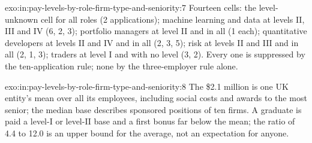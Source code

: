 \begin{solution}{exo:in:pay-levels-by-role-firm-type-and-seniority:7}
Fourteen cells: the level-unknown cell for all roles (2 applications); machine learning and data at levels II, III and IV
(6, 2, 3); portfolio managers at level II and in all (1 each); quantitative developers at levels II and IV and in all (2, 3,
5); risk at levels II and III and in all (2, 1, 3); traders at level I and with no level (3, 2). Every one is suppressed by
the ten-application rule; none by the three-employer rule alone.
\end{solution}

\begin{solution}{exo:in:pay-levels-by-role-firm-type-and-seniority:8}
The \$2.1 million is one UK entity's mean over all its employees, including social costs and awards to the most senior;
the median base describes sponsored positions of ten firms. A graduate is paid a level-I or level-II base and a first
bonus far below the mean; the ratio of 4.4 to 12.0 is an upper bound for the average, not an expectation for anyone.
\end{solution}

